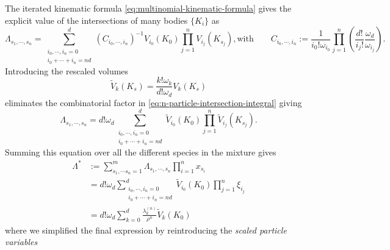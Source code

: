 \documentclass[11pt,twoside]{report}
\begin{document}
The iterated kinematic formula \eqref{eq:multinomial-kinematic-formula} gives the explicit value of the intersections of many bodies $\{K_i\}$ as \cite{Santalo2004,MarechalPRE2014}
\begin{subequations}\label{eq:multinomial-kinematic-equation}
  \begin{equation}
    \Lambda_{s_1, \cdots, s_n}
    =
      \sum_{\substack{i_0, \cdots, i_n = 0 \\ i_0 + \cdots + i_n = nd}}^d
      (C_{i_0, \cdots, i_n})^{-1}
      V_{i_0}(K_0)
      \prod_{j=1}^n
      V_{i_j}(K_{s_j}),
  \end{equation}
  \begin{equation}
    \textrm{with} \qquad
    C_{i_0, \cdots, i_n}
    := \frac{1}{i_0! \omega_{i_0}}
    \prod_{j=1}^n
    \left(
    \frac{d!}{i_j!} \frac{\omega_d}{\omega_{i_j}}
    \right).
  \end{equation}
\end{subequations}
Introducing the rescaled volumes
\begin{equation}\label{eq:rescaled-intrinsic-volumes}
  \widetilde{V}_k(K_s)
  =
  \frac{k! \omega_k}{d! \omega_d} V_k(K_s)
\end{equation}
eliminates the combinatorial factor in \eqref{eq:n-particle-intersection-integral} giving
\begin{equation}\label{eq:lambda-reduced}
  \Lambda_{s_1, \cdots, s_n}
  =
  d! \omega_d
  \sum_{\substack{i_0, \cdots, i_n = 0 \\ i_0 + \cdots + i_n = nd}}^d
  \widetilde{V}_{i_0}(K_0)
  \prod_{j=1}^n
  \widetilde{V}_{i_j}(K_{s_j}).
\end{equation}
Summing this equation over all the different species in the mixture gives
\begin{equation}
  \label{eq:final-lambda}
  \begin{split}
    \Lambda^*
    & :=
    \sum_{s_1, \cdots s_n = 1}^m
    \Lambda_{s_1, \cdots, s_n}
    \prod_{i=1}^n x_{s_i}
    \\ &=
    d! \omega_d
    \sum_{\substack{i_0, \cdots, i_n = 0 \\ i_0 + \cdots + i_n = nd}}^d
    \widetilde{V}_{i_0}(K_0)
    \prod_{j=1}^n
    \xi_{i_j}
    \\ &=
    d! \omega_d
    \sum_{k = 0}^d
    \frac{\lambda_k^{(n)}}{\rho^n}
    \widetilde{V}_{k}(K_0)
  \end{split}
\end{equation}
where we simplified the final expression by reintroducing the \emph{scaled particle variables}%
\end{document}
